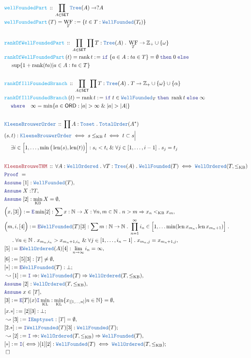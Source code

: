 \documentclass[12pt]{scrartcl}
\newcommand{\TYPE}[1]{\textcolor{NavyBlue}{\mathtt{#1}}}
\newcommand{\FUNC}[1]{\textcolor{Cerulean}{\mathtt{#1}}}
\newcommand{\LOGIC}[1]{\textcolor{Blue}{\mathtt{#1}}}
\newcommand{\THM}[1]{\textcolor{Maroon}{\mathtt{#1}}}
\renewcommand{\.}{\; . \;}
\newcommand{\de}{: \kern 0.1pc =}
\newcommand{\where}{\LOGIC{where}}
\newcommand{\If}{\LOGIC{if} \;}
\newcommand{\Then}{ \; \LOGIC{then} \;}
\newcommand{\Else}{\; \LOGIC{else} \;}
\newcommand{\Act}[1]{\left( #1 \right)}
\newcommand{\Theorem}[2]{& \THM{#1} \, :: \, #2 \\ & \Proof = \\ }
\newcommand{\DeclareType}[2]{& \TYPE{#1} \, :: \, #2 \\}
\newcommand{\DefineNamedType}[4]{& #1 : \TYPE{#2} \iff #3 \iff #4 \\}
\newcommand{\DeclareFunc}[2]{& \FUNC{#1} \, :: \, #2 \\}
\newcommand{\DefineNamedFunc}[4]{&  \FUNC{#1}\Act{#2} = #3 \de #4 \\}
\newcommand{\NewLine}{\\ & \kern 1pc}
\newcommand{\Page}[1]{ \begin{align*} #1 \end{align*}   }
\renewcommand{\And}{\; \& \;}
\newcommand{\Imply}{\Rightarrow}
\newcommand{\Intro}{\LOGIC{I}}
\newcommand{\Elim}{\LOGIC{E}}
\newcommand{\Int}{\mathbb{Z} }
\newcommand{\Nat}{\mathbb{N} }
\newcommand{\Say}[3]{& #1 \de #2 : #3, \\}
\newcommand{\Conclude}[3]{& #1 \de #2 : #3; \\}
\newcommand{\Derive}[3]{& \leadsto #1 \de #2 : #3, \\}
\newcommand{\Assume}[2]{& \LOGIC{Assume} \; #1 : #2, \\}
\newcommand{\AssumeIn}[2]{& \LOGIC{Assume} \; #1 \in #2, \\}
\newcommand{\QED}{\; \square}
\newcommand{\EndProof}{& \QED \\}
\newcommand{\Proof}{\LOGIC{Proof} \; }
\newcommand{\SET}{\mathsf{SET}}
\newcommand{\Toset}{\TYPE{Toset}}
\newcommand{\WF}{\TYPE{WellFounded}}
\newcommand{\WO}{\TYPE{WellOrdered}}
\newcommand{\ORD}{\mathsf{ORD}}
\DeclareMathOperator{\rank}{rank}
\newcommand{\FS}[1]{{#1}{}^*}
\newcommand{\Tree}{\TYPE{Tree}}
\DeclareMathOperator{\len}{len}
\newcommand{\inits}[2]{{#1}_{|\left[1,\ldots,#2\right]}}
\DeclareMathOperator{\WFpart}{WF}
\begin{document}
\Page{
	\DeclareFunc{wellFoundedPart}
	{
		\prod_{A \in \SET} \Tree(A) \to ?A
	}
	\DefineNamedFunc{wellFoundedPart}{T}{\WFpart_T}
	{
		\{ t \in T : \WF(T_t)  \}
	}
	\\
	\DeclareFunc{rankOfWellFoundedPart}
	{
		\prod_{A \in \SET} \prod T : \Tree(A) \. \WFpart_T \to \Int_+ \cup \{\omega\} 
	}
	\DefineNamedFunc{rankOfWellFoundedPart}{t}{\rank t}{
		\If \{ a \in A : ta \in T  \} = \emptyset
		\Then 0 
		\Else  \NewLine \sup \{ 1 + \rank(ta) | a \in A : ta \in T   \}
	}
	\\
	\DeclareFunc{rankOfIllFoundedBranch}
	{
		\prod_{A \in \SET} \prod T : \Tree(A) \. T \to \Int_+ \cup \{\omega\} \cup 
		\{\alpha\}
	}
	\DefineNamedFunc{rankOfIllFoundedBranch}{t}{\rank t}{
		\If t \in \WF_T
		\Then \rank t
		\Else \infty
		\NewLine 
		\where \quad
		\infty = \min \{ a \in \ORD : |a| > \infty \And |a| > |A|  \}
	}
	\\
	\DeclareType{KleeneBrouwerOrder}{\prod A : \Toset \. \TYPE{TotalOrder}(\FS{A})}
	\DefineNamedType{(s,t)}{KleeneBrouwerOrder}{s \le_{\mathrm{KB}} t}
	{
		t \subset s \Big| \NewLine 
		\exists i \in \Big[1,\ldots,\min\big(\len(s),\len(t)\big)\Big] :
		s_i < t_i \And \forall j \in [1,\ldots,i-1] \. s_j = t_j
	}
	\\
	\Theorem{KleeneBrouweTHM}
	{
		\forall A : \WO \.
		\forall T : \Tree(A) \.
		\WF(T) \iff \WO(T,\le_{\mathrm{KB}} )
	}
	\Assume{[1]}{\WF(T)}
	\Assume{X}{?T}
	\Assume{[2]}{\min_{\mathrm{KB}} X = \emptyset}
	\Say{\Big(x,[3]\Big)}{\Elim \min [2]}
	{
		\sum x : \Nat \to X : \forall n,m \in \Nat \. n > m \Imply x_n <_{\mathrm{KB}} x_m
	}
	\Say{\Big(m,i,[4]\Big)}{\Elim \WF(T)[3] }
	{
		\sum m : \Nat \to \Nat \. 
		\prod^\infty_{n=1} i_n \in 
		\Big[1,\ldots \min(\len x_{m_n},\len x_{m_n + 1})\Big] \.
		\NewLine
		\.
		\forall n \in \Nat \.
		x_{m_n,i_n} > x_{m_n + 1,i_n}
		\And
		\forall j \in [1,\ldots,i_n - 1] \.
		x_{m_n,j} = x_{m_n +1, j}
	}
	\Say{[5]}{\Elim \WO(A)[4]}{\lim_{n \to \infty} i_n = \infty}
	\Say{[6]}{ [5][3]  }{ [T] \neq \emptyset }
	\Conclude{[*]}{\Elim \WF(T)}{\bot}
	\Derive{[1]}{\Intro \Imply}
	{
		\WF(T)
		\Imply
		\WO(T,\le_{\mathrm{KB}})
	}
	\Assume{[2]}{\WO(T,\le_{\mathrm{KB}})}
	\AssumeIn{x}{[T]}
	\Say{[3]}{\Elim [T](x) \Intro \min_{\mathrm{KL}}}{\min_{\mathrm{KL}}\{ \inits{x}{n} | n \in \Nat  \} = \emptyset}
	\Conclude{[x.*]}{[2][3]}{\bot}
	\Derive{[3]}{\Intro \TYPE{Emptyset}}{[T] = \emptyset}
	\Conclude{[2.*]}{\Intro \WF(T)[3]}{\WF(T)}
	\Derive{[2]}{\Intro \Imply}
	{   
		\WO(T,\le_{\mathrm{KB}})
		\Imply
		\WF(T)
	}
	\Conclude{[*]}{\Intro(\iff)[1][2]}
	{
		\WF(T)
		\iff
		\WO(T,\le_{\mathrm{KB}})
	}
	\EndProof
}
\newpage
\end{document}
